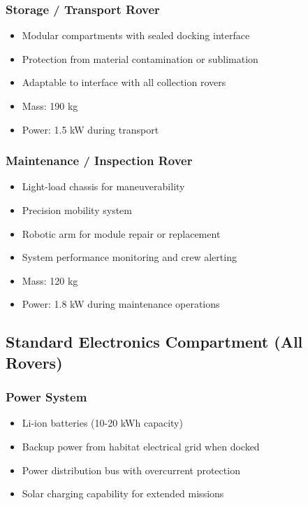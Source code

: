 \documentclass[12pt, a4paper]{article}
\begin{document}
\subsubsection{Storage / Transport Rover}
\begin{itemize}
    \item Modular compartments with sealed docking interface
    \item Protection from material contamination or sublimation
    \item Adaptable to interface with all collection rovers
    \item Mass: 190 kg
    \item Power: 1.5 kW during transport
\end{itemize}

\subsubsection{Maintenance / Inspection Rover}
\begin{itemize}
    \item Light-load chassis for maneuverability
    \item Precision mobility system
    \item Robotic arm for module repair or replacement
    \item System performance monitoring and crew alerting
    \item Mass: 120 kg
    \item Power: 1.8 kW during maintenance operations
\end{itemize}

\subsection{Standard Electronics Compartment (All Rovers)}

\subsubsection{Power System}
\begin{itemize}
    \item Li-ion batteries (10-20 kWh capacity)
    \item Backup power from habitat electrical grid when docked
    \item Power distribution bus with overcurrent protection
    \item Solar charging capability for extended missions
\end{itemize}
\end{document}
